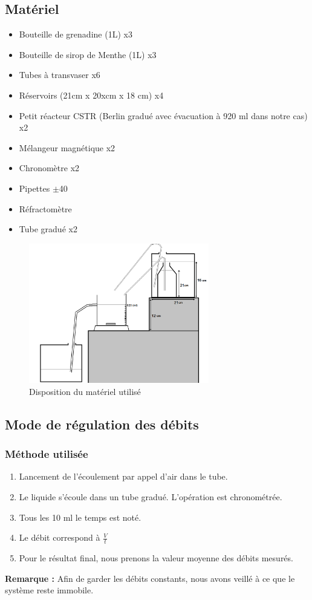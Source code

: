 \documentclass[a4paper,11pt, french]{article}
\begin{document}
	\subsection{Matériel}
		\begin{itemize}
			\item Bouteille de grenadine (1L) x3
			\item Bouteille de sirop de Menthe (1L) x3
			\item Tubes à transvaser x6
			\item Réservoirs (21cm x 20xcm x 18 cm) x4
			\item Petit réacteur CSTR (Berlin gradué avec évacuation à 920 ml dans notre cas) x2
			\item Mélangeur magnétique x2
			\item Chronomètre x2
			\item Pipettes $\pm$40
			\item Réfractomètre
			\item Tube gradué x2	
		\end{itemize}
		\begin{figure}[h]
			\centering
			\includegraphics[width=0.7\textwidth]{pictures/materiel.png}
			\caption{Disposition du matériel utilisé}
		\end{figure}	
		
	\subsection{Mode de régulation des débits}
		\subsubsection{Méthode utilisée}
			\begin{enumerate}
				\item Lancement de l'écoulement par appel d'air dans le tube.
				\item Le liquide s'écoule dans un tube gradué. L'opération est chronométrée.
				\item Tous les 10 ml le temps est noté. 
				\item Le débit correspond à $\frac{V}{t}$
				\item Pour le résultat final, nous prenons la valeur moyenne des débits mesurés.
			\end{enumerate}
			\textbf{Remarque :} Afin de garder les débits constants, nous avons veillé à ce que le système reste immobile.
			
\end{document}
